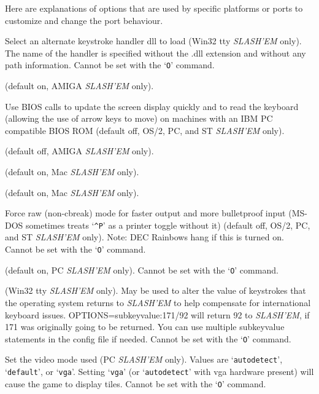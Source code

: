 Here are explanations of options that are used by specific platforms or ports 
to customize and change the port behaviour.
\blist{}

\item[\ib{altkeyhandler}]
Select an alternate keystroke handler dll to load (Win32 tty {\it SLASH'EM\/} only).
The name of the handler is specified without the .dll extension and without any
path information.
Cannot be set with the `{\tt O}' command.

\item[\ib{altmeta}]
(default on, AMIGA {\it SLASH'EM\/} only).

\item[\ib{BIOS}]
Use BIOS calls to update the screen
display quickly and to read the keyboard (allowing the use of arrow
keys to move) on machines with an IBM PC compatible BIOS ROM (default off,
OS/2, PC, and ST {\it SLASH'EM\/} only).

\item[\ib{flush}]
(default off, AMIGA {\it SLASH'EM\/} only).

\item[\ib{MACgraphics}]
(default on, Mac {\it SLASH'EM\/} only).

\item[\ib{page\_wait}]
(default on, Mac {\it SLASH'EM\/} only).

\item[\ib{rawio}]
Force raw (non-cbreak) mode for faster output and more
bulletproof input (MS-DOS sometimes treats `{\tt \^{}P}' as a printer toggle
without it) (default off, OS/2, PC, and ST {\it SLASH'EM\/} only).
Note:  DEC Rainbows hang if this is turned on.
Cannot be set with the `{\tt O}' command.

\item[\ib{soundcard}]
(default on, PC {\it SLASH'EM\/} only).
Cannot be set with the `{\tt O}' command.

\item[\ib{subkeyval}]
(Win32 tty {\it SLASH'EM\/} only).
May be used to alter the value of keystrokes that the operating system
returns to {\it SLASH'EM\/} to help compensate for international keyboard issues.
OPTIONS=subkeyvalue:171/92
will return 92 to {\it SLASH'EM}, if 171 was originally going to be returned.
You can use multiple subkeyvalue statements in the config file if needed.
Cannot be set with the `{\tt O}' command.

\item[\ib{video}]
Set the video mode used (PC {\it SLASH'EM\/} only).
Values are `{\tt autodetect}', `{\tt default}', or `{\tt vga}'.
Setting `{\tt vga}' (or `{\tt autodetect}' with vga hardware present) will cause
the game to display tiles. 
Cannot be set with the `{\tt O}' command.

